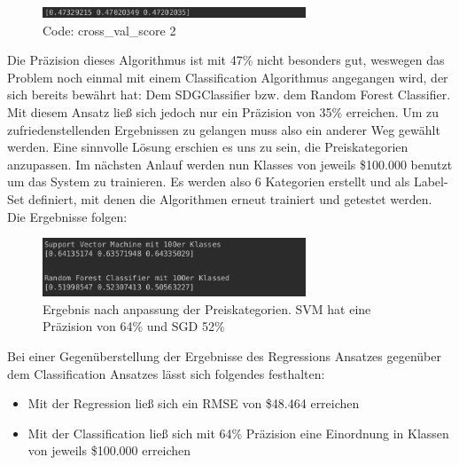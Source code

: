 \begin{figure}
	\includegraphics[width=0.7\textwidth]{../Bilder/pasted image 0 (6).png} 
	\caption{Code: cross\_val\_score 2}
\end{figure}
Die Präzision dieses Algorithmus ist mit 47\% nicht besonders gut, weswegen das Problem noch einmal mit einem Classification Algorithmus angegangen wird, der sich bereits bewährt hat: Dem SDGClassifier bzw. dem Random Forest Classifier. Mit diesem Ansatz ließ sich jedoch nur ein Präzision von 35\% erreichen. Um zu zufriedenstellenden Ergebnissen zu gelangen muss also ein anderer Weg gewählt werden. 
\newline
Eine sinnvolle Lösung erschien es uns zu sein, die Preiskategorien anzupassen. Im nächsten Anlauf werden nun Klasses von jeweils \$100.000 benutzt um das System zu trainieren. Es werden also 6 Kategorien erstellt und als Label-Set definiert, mit denen die Algorithmen erneut trainiert und getestet werden. Die Ergebnisse folgen:
\newline
\begin{figure}
	\includegraphics[width=0.7\textwidth]{../Bilder/pasted image 0 (7).png}
	\caption{Ergebnis nach anpassung der Preiskategorien. \ac{SVM} hat eine Präzision von 64\% und SGD 52\%}
\end{figure}

Bei einer Gegenüberstellung der Ergebnisse des Regressions Ansatzes gegenüber dem Classification Ansatzes lässt sich folgendes festhalten:
\begin{itemize}
\item Mit der Regression ließ sich ein \ac{RMSE} von \$48.464 erreichen
\item Mit der Classification ließ sich mit 64\% Präzision eine Einordnung in Klassen von jeweils \$100.000 erreichen
\end{itemize}

